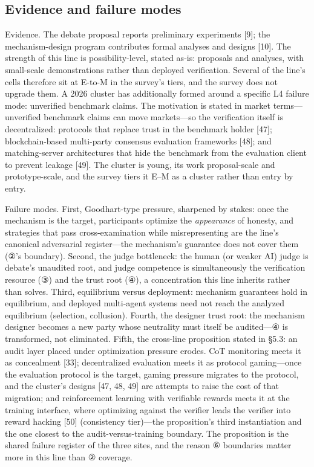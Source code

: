\documentclass[11pt]{article}
\begin{document}
\subsection{Evidence and failure modes}
\noindent Evidence. The debate proposal reports preliminary experiments [9]; the mechanism-design program contributes formal analyses and designs [10]. The strength of this line is possibility-level, stated as-is: proposals and analyses, with small-scale demonstrations rather than deployed verification. Several of the line's cells therefore sit at E-to-M in the survey's tiers, and the survey does not upgrade them. A 2026 cluster has additionally formed around a specific L4 failure mode: unverified benchmark claims. The motivation is stated in market terms—unverified benchmark claims can move markets—so the verification itself is decentralized: protocols that replace trust in the benchmark holder [47]; blockchain-based multi-party consensus evaluation frameworks [48]; and matching-server architectures that hide the benchmark from the evaluation client to prevent leakage [49]. The cluster is young, its work proposal-scale and prototype-scale, and the survey tiers it E–M as a cluster rather than entry by entry.\par
\noindent Failure modes. First, Goodhart-type pressure, sharpened by stakes: once the mechanism is the target, participants optimize the \emph{appearance} of honesty, and strategies that pass cross-examination while misrepresenting are the line's canonical adversarial register—the mechanism's guarantee does not cover them (②'s boundary). Second, the judge bottleneck: the human (or weaker AI) judge is debate's unaudited root, and judge competence is simultaneously the verification resource (③) and the trust root (④), a concentration this line inherits rather than solves. Third, equilibrium versus deployment: mechanism guarantees hold in equilibrium, and deployed multi-agent systems need not reach the analyzed equilibrium (selection, collusion). Fourth, the designer trust root: the mechanism designer becomes a new party whose neutrality must itself be audited—④ is transformed, not eliminated. Fifth, the cross-line proposition stated in §5.3: an audit layer placed under optimization pressure erodes. CoT monitoring meets it as concealment [33]; decentralized evaluation meets it as protocol gaming—once the evaluation protocol is the target, gaming pressure migrates to the protocol, and the cluster's designs [47, 48, 49] are attempts to raise the cost of that migration; and reinforcement learning with verifiable rewards meets it at the training interface, where optimizing against the verifier leads the verifier into reward hacking [50] (consistency tier)—the proposition's third instantiation and the one closest to the audit-versus-training boundary. The proposition is the shared failure register of the three sites, and the reason ⑥ boundaries matter more in this line than ② coverage.\par
\end{document}

